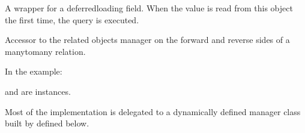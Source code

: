 \documentclass[letterpaper,10pt,english]{sphinxmanual}
\begin{document}
\begin{fulllineitems}
\begin{fulllineitems}
\end{fulllineitems}


\begin{fulllineitems}
\label{\detokenize{app:app.models.resources_categories.count}}
\pysigstartsignatures
{}
\pysigstopsignatures
\sphinxAtStartPar
A wrapper for a deferred\sphinxhyphen{}loading field. When the value is read from this
object the first time, the query is executed.

\end{fulllineitems}


\begin{fulllineitems}
\label{\detokenize{app:app.models.resources_categories.io_type}}
\pysigstartsignatures
{}
\pysigstopsignatures
\sphinxAtStartPar
Accessor to the related objects manager on the forward and reverse sides of
a many\sphinxhyphen{}to\sphinxhyphen{}many relation.

\sphinxAtStartPar
In the example:

\begin{sphinxVerbatim}[commandchars=\\\{\}]
 
       
\end{sphinxVerbatim}

\sphinxAtStartPar
{} and  are 
instances.

\sphinxAtStartPar
Most of the implementation is delegated to a dynamically defined manager
class built by  defined below.

\end{fulllineitems}



\end{fulllineitems}
\end{document}
